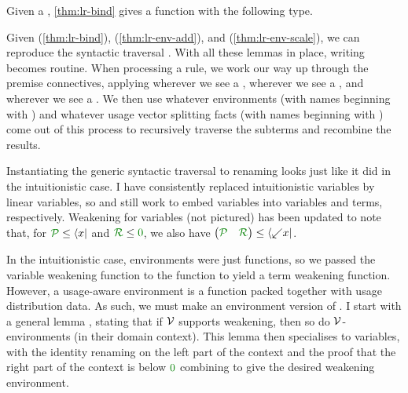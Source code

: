 
Given a \AgdaSpace{}\AgdaBound{$\V$},
\cref{thm:lr-bind} gives a function with the following type.


Given  (\cref{thm:lr-bind}), 
(\cref{thm:lr-env-add}), and  (\cref{thm:lr-env-scale}),
we can reproduce the syntactic traversal .
With all these lemmas in place, writing 
becomes routine.
When processing a rule, we work our way up through the
premise connectives, applying  wherever we see a
,  wherever we see a
, and  wherever we see a
.
We then use whatever environments (with names beginning with
\AgdaBound{$\rho$}) and whatever usage vector splitting facts (with names
beginning with ) come out of this process to recursively
traverse the subterms and recombine the results.


Instantiating the generic syntactic traversal  to renaming
looks just like it did in the intuitionistic case.
I have consistently replaced intuitionistic variables by linear variables, so
 and  still work to embed
variables into variables and terms, respectively.
Weakening for variables  (not pictured) has been
updated to note that, for $\grP \leq \bra x$ and $\grR \leq \gr0$, we also have
$\begin{pmatrix} \grP & \grR \end{pmatrix} \leq \bra{{\swarrow}x}$.


In the intuitionistic case, environments were just functions, so we passed the
variable weakening function  to the function
 to yield a term weakening function.
However, a usage-aware environment is a function packed together with usage
distribution data.
As such, we must make an environment version of .
I start with a general lemma , stating that if
$\V$ supports weakening, then so do $\V$-environments (in their domain
context).
This lemma then specialises to variables, with the identity renaming
 on the left part of the context and the proof
 that the right part of the context is below $\gr0$ combining
to give the desired weakening environment.

